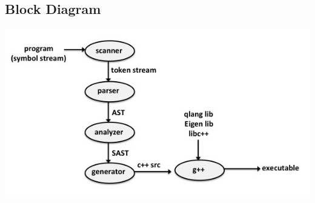 \subsection{Block Diagram}
\begin{center}
\includegraphics[scale=0.65]{architectural_diagram/architecture.jpg}
\end{center} 
